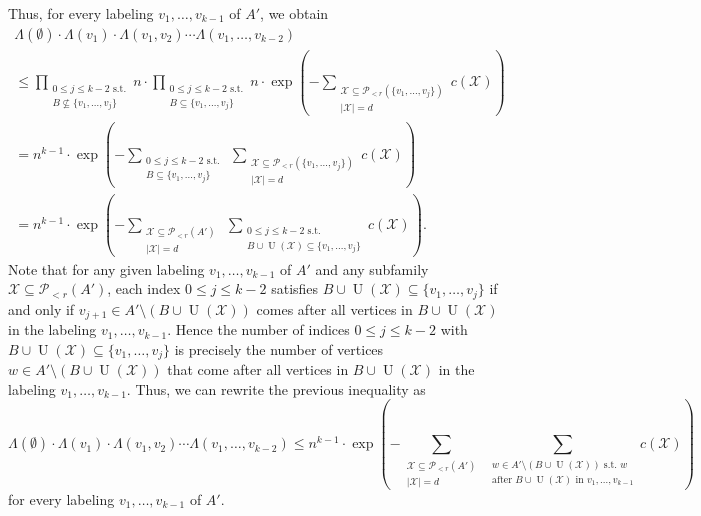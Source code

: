 \documentclass[11pt]{article}
\theoremstyle{definition}
\numberwithin{equation}{section}
\begin{document}
Thus, for every labeling $v_1,\dots,v_{k-1}$ of $A'$, we obtain
\begin{multline*}
\Lambda(\emptyset)\cdot \Lambda(v_1)\cdot \Lambda(v_1, v_2)\dotsm \Lambda(v_1,\dots,v_{k-2})\\
\leq \prod_{\substack{0\leq j\leq k-2\text{ s.t.}\\B\not\subseteq \lbrace v_1,\dots,v_j\rbrace}}n\cdot \prod_{\substack{0\leq j\leq k-2\text{ s.t.}\\B\subseteq \lbrace v_1,\dots,v_j\rbrace}}n\cdot \exp\left(-\sum_{\substack{\mathcal{X}\subseteq \mathcal{P}\!_{<r}(\lbrace v_1,\dots,v_j\rbrace)\\\vert \mathcal{X}\vert=d}}c(\mathcal{X})\right)\\
=n^{k-1}\cdot \exp\left(-\sum_{\substack{0\leq j\leq k-2\text{ s.t.}\\B\subseteq \lbrace v_1,\dots,v_j\rbrace}}\ \sum_{\substack{\mathcal{X}\subseteq \mathcal{P}\!_{<r}(\lbrace v_1,\dots,v_j\rbrace)\\\vert \mathcal{X}\vert=d}}c(\mathcal{X})\right)\\
=n^{k-1}\cdot \exp\left(-\sum_{\substack{\mathcal{X}\subseteq \mathcal{P}\!_{<r}(A')\\\vert \mathcal{X}\vert=d}}\ \sum_{\substack{0\leq j\leq k-2\text{ s.t.}\\B\cup \operatorname{U}(\mathcal{X})\subseteq \lbrace v_1,\dots,v_j\rbrace}}c(\mathcal{X})\right).
\end{multline*}
Note that for any given labeling $v_1,\dots,v_{k-1}$ of $A'$ and any subfamily $\mathcal{X}\subseteq \mathcal{P}\!_{<r}(A')$, each index $0\leq j\leq k-2$ satisfies $B\cup \operatorname{U}(\mathcal{X})\subseteq \lbrace v_1,\dots,v_j\rbrace$ if and only if $v_{j+1}\in A'\setminus (B\cup \operatorname{U}(\mathcal{X}))$ comes after all vertices in $B\cup \operatorname{U}(\mathcal{X})$ in the labeling $v_1,\dots,v_{k-1}$. Hence the number of indices $0\leq j\leq k-2$ with $B\cup \operatorname{U}(\mathcal{X})\subseteq \lbrace v_1,\dots,v_j\rbrace$ is precisely the number of vertices $w\in A'\setminus (B\cup \operatorname{U}(\mathcal{X}))$ that come after all vertices in $B\cup \operatorname{U}(\mathcal{X})$ in the labeling $v_1,\dots,v_{k-1}$. Thus, we can rewrite the previous inequality as
\[\Lambda(\emptyset)\cdot \Lambda(v_1)\cdot \Lambda(v_1, v_2)\dotsm \Lambda(v_1,\dots,v_{k-2})\leq n^{k-1}\cdot \exp\left(-\sum_{\substack{\mathcal{X}\subseteq \mathcal{P}\!_{<r}(A')\\\vert \mathcal{X}\vert=d}}\ \sum_{\substack{w\in A'\setminus(B\cup \operatorname{U}(\mathcal{X}))\text{ s.t. }w\\\text{after }B\cup \operatorname{U}(\mathcal{X})\text{ in }v_1,\dots,v_{k-1}}}c(\mathcal{X})\right)\]
for every labeling $v_1,\dots,v_{k-1}$ of $A'$.
\end{document}
